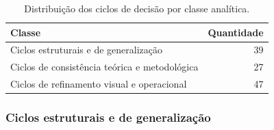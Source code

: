 \begin{table}[ht]
\centering
\caption{Distribuição dos ciclos de decisão por classe analítica.}
\label{tab:classes-ciclos}
\begin{tabular}{lr}
\toprule
\textbf{Classe} & \textbf{Quantidade} \\
\midrule
Ciclos estruturais e de generalização & 39 \\
Ciclos de consistência teórica e metodológica & 27 \\
Ciclos de refinamento visual e operacional & 47 \\
\bottomrule
\end{tabular}
\end{table}
\subsubsection{Ciclos estruturais e de generalização}
